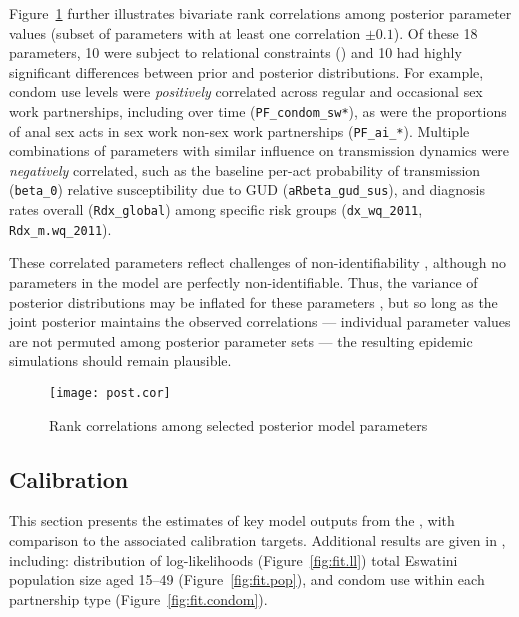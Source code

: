 \par
Figure~\ref{fig:post.cor} further illustrates bivariate rank correlations among
posterior parameter values (subset of parameters with at least one correlation $\pm 0.1$).
Of these 18 parameters, 10 were subject to relational constraints ()
and 10 had highly significant differences between prior and posterior distributions.
For example, condom use levels were \emph{positively} correlated across
regular and occasional sex work partnerships, including over time (\texttt{PF_condom_sw*}), as were
the proportions of anal sex acts in sex work \vs non-sex work partnerships (\texttt{PF_ai_*}).
Multiple combinations of parameters with similar influence on transmission dynamics
were \emph{negatively} correlated, such as
the baseline per-act probability of transmission (\texttt{beta_0}) \vs
relative susceptibility due to GUD (\texttt{aRbeta_gud_sus}), and
diagnosis rates overall (\texttt{Rdx_global}) \vs
among specific risk groups (\texttt{dx_wq_2011}, \texttt{Rdx_m.wq_2011}).
\par
These correlated parameters reflect challenges of non-identifiability \cite{Raue2009},
although no parameters in the model are perfectly non-identifiable.
Thus, the variance of posterior distributions may be inflated for these parameters \cite{Raue2009},
but so long as the joint posterior maintains the observed correlations
--- \ie individual parameter values are not permuted among posterior parameter sets ---
the resulting epidemic simulations should remain plausible.
\begin{figure}
  \centering\texttt{[image: post.cor]}
  \caption{Rank correlations among selected posterior model parameters}
  \label{fig:post.cor}
\end{figure}
\subsection{Calibration}\label{model.res.cal}
This section presents the estimates of key model outputs from the \fffit,
with comparison to the associated calibration targets.
Additional results are given in , including:
distribution of log-likelihoods (Figure~\ref{fig:fit.ll})
total Eswatini population size aged 15--49 (Figure~\ref{fig:fit.pop}),
and condom use within each partnership type (Figure~\ref{fig:fit.condom}).
